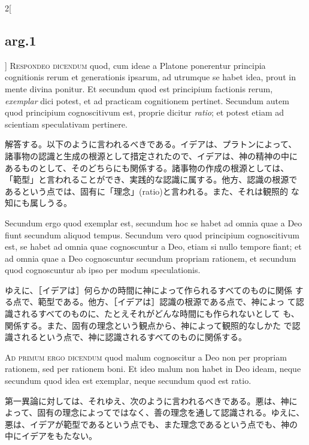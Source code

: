 \documentclass[paper=a4paper,fontsize=10pt,jafontsize=9pt,titlepage]{jlreq}
\begin{document}
\begin{paracol}{2}[\subsection{arg.1}]
{\scshape Respondeo dicendum} quod, cum ideae a Platone ponerentur
principia cognitionis rerum et generationis ipsarum, ad utrumque se
habet idea, prout in mente divina ponitur. Et secundum quod est
principium factionis rerum, {\itshape exemplar} dici potest, et ad
practicam cognitionem pertinet. Secundum autem quod principium
cognoscitivum est, proprie dicitur {\itshape ratio}; et potest etiam
ad scientiam speculativam pertinere.

\switchcolumn

解答する。以下のように言われるべきである。イデアは、プラトンによって、
諸事物の認識と生成の根源として措定されたので、イデアは、神の精神の中に
あるものとして、そのどちらにも関係する。諸事物の作成の根源としては、
「範型」と言われることができ、実践的な認識に属する。他方、認識の根源で
あるという点では、固有に「理念」(ratio)と言われる。また、それは観照的
な知にも属しうる。

\switchcolumn*

Secundum ergo quod exemplar est, secundum hoc se habet ad omnia quae a
Deo fiunt secundum aliquod tempus. Secundum vero quod principium
cognoscitivum est, se habet ad omnia quae cognoscuntur a Deo, etiam si
nullo tempore fiant; et ad omnia quae a Deo cognoscuntur secundum
propriam rationem, et secundum quod cognoscuntur ab ipso per modum
speculationis.

\switchcolumn

ゆえに、［イデアは］何らかの時間に神によって作られるすべてのものに関係
する点で、範型である。他方、［イデアは］認識の根源である点で、神によっ
て認識されるすべてのものに、たとえそれがどんな時間にも作られないとして
も、関係する。また、固有の理念という観点から、神によって観照的なしかた
で認識されるという点で、神に認識されるすべてのものに関係する。

\switchcolumn*[\subsection{ad.1}]

{\scshape Ad primum ergo dicendum} quod malum cognoscitur a Deo non
per propriam rationem, sed per rationem boni. Et ideo malum non habet
in Deo ideam, neque secundum quod idea est exemplar, neque secundum
quod est ratio.

\switchcolumn

第一異論に対しては、それゆえ、次のように言われるべきである。悪は、神に
よって、固有の理念によってではなく、善の理念を通して認識される。ゆえに、
悪は、イデアが範型であるという点でも、また理念であるという点でも、神の
中にイデアをもたない。


\end{paracol}
\end{document}
